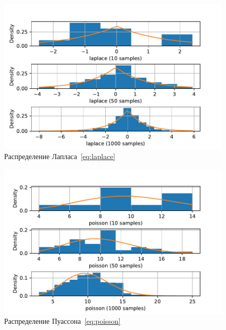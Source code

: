 \documentclass[a4paper]{article}
\begin{document}
        \begin{figure}[H]
            \centering
            \includegraphics[width = 16 cm]{src_lab_1/laplace}
            \caption{Распределение Лапласа~\eqref{eq:laplace}}
            \label{fig:laplace}
        \end{figure}

        \begin{figure}[H]
            \centering
            \includegraphics[width = 16 cm]{src_lab_1/poisson}
            \caption{Распределение Пуассона~\eqref{eq:poisson}}
            \label{fig:poisson}
        \end{figure}
\end{document}
